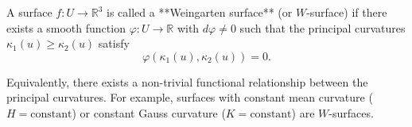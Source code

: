 A surface $f: U \to \mathbb{R}^3$ is called a **Weingarten surface** (or $W$-surface) if there exists a smooth function $\varphi: U \to \mathbb{R}$ with $d\varphi \neq 0$ such that the principal curvatures $\kappa_1(u) \geq \kappa_2(u)$ satisfy
$$\varphi(\kappa_1(u), \kappa_2(u)) = 0.$$

Equivalently, there exists a non-trivial functional relationship between the principal curvatures. For example, surfaces with constant mean curvature ($H = \text{constant}$) or constant Gauss curvature ($K = \text{constant}$) are $W$-surfaces.
